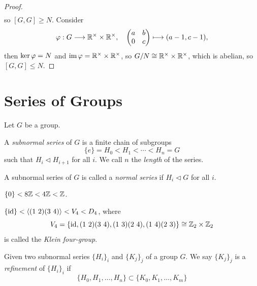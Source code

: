 \begin{proof}
\begin{align*}
  \end{align*}
  so \([G,G]\geq N\).
  Consider \[
    \varphi: G \longrightarrow \mathbb{R}^\times\times\mathbb{R}^\times,
    \quad
    \begin{pmatrix}
      a & b \\
      0 & c
    \end{pmatrix} \longmapsto (a-1,c-1),
  \] then \(\ker\varphi = N\) and \(\operatorname{im}\varphi = \mathbb{R}^\times\times\mathbb{R}^\times\), so \(G/N\cong\mathbb{R}^\times\times\mathbb{R}^\times\),
  which is abelian, so \([G,G]\leq N\).
\end{proof}


\section{Series of Groups}
Let \(G\) be a group.
\begin{definition}
  A \emph{subnormal series} of \(G\) is a finite chain of subgroups \[
    \{e\} = H_0 < H_1 < \cdots < H_n = G
  \] such that \(H_i \lhd H_{i+1}\) for all \(i\). We call \(n\) the \emph{length} of the series.
\end{definition}

\begin{definition}
  A subnormal series of \(G\) is called a \emph{normal series} if \(H_i \lhd G\) for all \(i\).
\end{definition}

\begin{example}
  \(\{0\} < 8\mathbb{Z} < 4\mathbb{Z} < \mathbb{Z}\).
\end{example}

\begin{example}
  \(\{\operatorname{id}\} < \langle(1\ 2)(3\ 4)\rangle < V_4 < D_4\), where \[
    V_4 = \{\operatorname{id}, (1\ 2)(3\ 4), (1\ 3)(2\ 4), (1\ 4)(2\ 3)\}\cong \mathbb{Z}_2\times\mathbb{Z}_2
  \] is called the \emph{Klein four-group}.
\end{example}

\begin{definition}
  Given two subnormal series \(\{H_i\}_i\) and \(\{K_j\}_j\) of a group \(G\). We say \(\{K_j\}_j\) is a \emph{refinement} of \(\{H_i\}_i\) if \[
    \{H_0, H_1, \ldots, H_n\} \subset \{K_0, K_1, \ldots, K_m\}
  \]
\end{definition}

